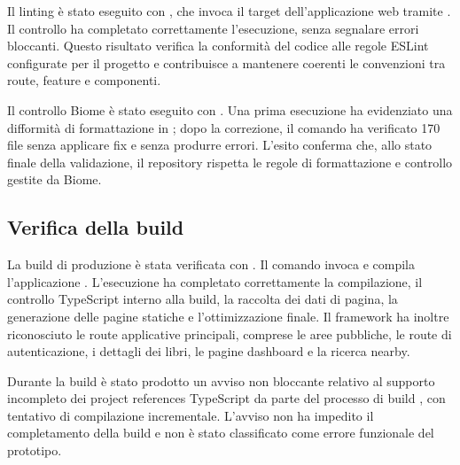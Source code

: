 Il linting è stato eseguito con , che invoca il target  dell'applicazione web tramite \nx{}. Il controllo ha completato correttamente l'esecuzione, senza segnalare errori bloccanti. Questo risultato verifica la conformità del codice alle regole ESLint configurate per il progetto e contribuisce a mantenere coerenti le convenzioni tra route, feature e componenti.

Il controllo Biome è stato eseguito con . Una prima esecuzione ha evidenziato una difformità di formattazione in ; dopo la correzione, il comando ha verificato 170 file senza applicare fix e senza produrre errori. L'esito conferma che, allo stato finale della validazione, il repository rispetta le regole di formattazione e controllo gestite da Biome.


\subsection{Verifica della build}
\label{subsec:build-validation}

La build di produzione è stata verificata con . Il comando invoca \nx{} e compila l'applicazione \nextjs{}. L'esecuzione ha completato correttamente la compilazione, il controllo TypeScript interno alla build, la raccolta dei dati di pagina, la generazione delle pagine statiche e l'ottimizzazione finale. Il framework ha inoltre riconosciuto le route applicative principali, comprese le aree pubbliche, le route di autenticazione, i dettagli dei libri, le pagine dashboard e la ricerca nearby.

Durante la build è stato prodotto un avviso non bloccante relativo al supporto incompleto dei project references TypeScript da parte del processo di build \nextjs{}, con tentativo di compilazione incrementale. L'avviso non ha impedito il completamento della build e non è stato classificato come errore funzionale del prototipo.

